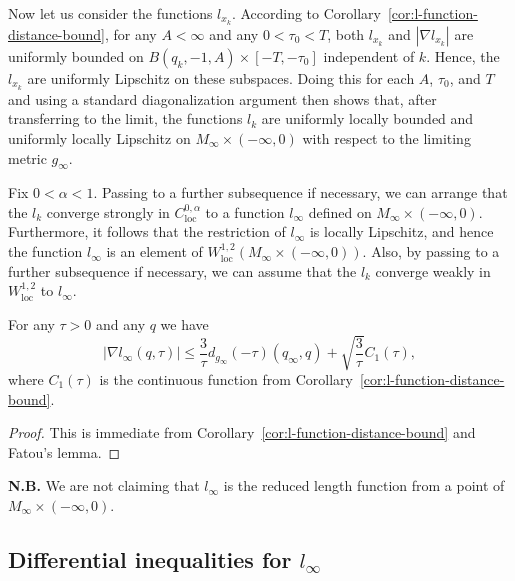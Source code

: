 Now let us consider the functions $l_{x_k}$. According to
Corollary~\ref{cor:l-function-distance-bound}, for any $A<\infty$ and any $0<\tau_0<T$,
both $l_{x_k}$ and $|\nabla l_{x_k}|$ are uniformly bounded on
$B(q_k,-1,A)\times [-T,-\tau_0]$ independent of $k$. Hence, the
$l_{x_k}$ are uniformly Lipschitz on these subspaces. Doing this for
each $A$, $\tau_0$, and $T$ and using a standard diagonalization
argument then shows that, after transferring to the limit, the
functions $l_k$ are uniformly locally bounded and uniformly locally
Lipschitz on $M_\infty\times (-\infty,0)$ with respect to the
limiting metric $g_\infty$.

Fix $0<\alpha<1$. Passing to a further subsequence if necessary, we
can arrange that the $l_k$ converge strongly
in $C^{0,\alpha}_\mathrm{loc}$ to a function $l_\infty$ defined on
$M_\infty\times(-\infty,0)$. Furthermore, it follows that the
restriction of $l_\infty$ is locally Lipschitz, and hence the
function $l_\infty$ is an element of $W^{1,2}_\mathrm{loc}\left(M_\infty\times(-\infty,0)\right)$. Also, by passing to a
further subsequence if necessary, we can assume that the $l_k$
converge weakly in $W^{1,2}_\mathrm{loc}$ to $l_\infty$.


\begin{corollary}\label{cor:l-infinity-gradient-bound}
\label{linfest}
For any $\tau>0$ and any $q$ we have
$$|\nabla l_\infty(q,\tau)|\le
\frac{3}{\tau}d_{g_\infty}(-\tau)(q_\infty,q)+\sqrt{\frac{3}{\tau}}C_1(\tau),$$
where $C_1(\tau)$ is the continuous function from
Corollary~\ref{cor:l-function-distance-bound}.
\end{corollary}


\begin{proof}
This is immediate from Corollary~\ref{cor:l-function-distance-bound} and Fatou's lemma.
\end{proof}

\begin{remark}\label{rem:l-infinity-not-reduced-length}
{\bf N.B.} We are not claiming that $l_\infty$ is the reduced length
function from a point of $M_\infty\times (-\infty,0)$.
\end{remark}

\subsection{Differential inequalities for $l_\infty$}

